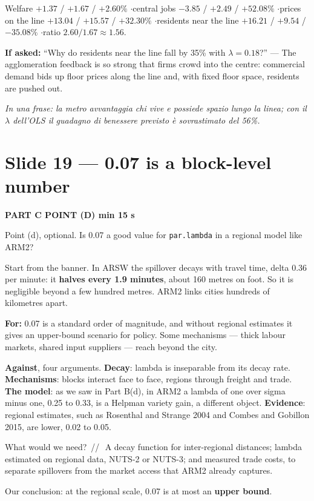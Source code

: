 \documentclass[11pt,a4paper]{article}
\newcommand{\slide}[3]{\Needspace{14\baselineskip}\section{#1}\textcolor{unicared}{\small\bfseries\MakeUppercase{#3}\quad\textperiodcentered\quad #2}\par}
\newcommand{\idea}[1]{\par{\small\itshape\color{unicablue}In una frase: #1}\par}
\newcommand{\pause}{\textcolor{unicared}{\,/\!/\,}}
\begin{document}
\begin{nums}
Welfare $+1.37$ / $+1.67$ / $+2.60\%$ \quad$\cdot$\quad central jobs $-3.85$ / $+2.49$ / $+52.08\%$ \quad$\cdot$\quad prices on the line $+13.04$ / $+15.57$ / $+32.30\%$ \quad$\cdot$\quad residents near the line $+16.21$ / $+9.54$ / $-35.08\%$ \quad$\cdot$\quad ratio $2.60/1.67 \approx 1.56$.
\end{nums}
\begin{ask}
\textbf{If asked:} ``Why do residents near the line fall by 35\% with $\lambda = 0.18$?'' --- The agglomeration feedback is so strong that firms crowd into the centre: commercial demand bids up floor prices along the line and, with fixed floor space, residents are pushed out.
\end{ask}
\idea{la metro avvantaggia chi vive e possiede spazio lungo la linea; con il $\lambda$ dell'OLS il guadagno di benessere previsto è sovrastimato del 56\%.}

\slide{Slide 19 --- 0.07 is a block-level number}{1 min 15 s}{Part C \textperiodcentered{} point (d)}

\begin{say}
Point (d), optional. Is 0.07 a good value for \texttt{par.lambda} in a regional model like ARM2?

Start from the banner. In ARSW the spillover decays with travel time, delta 0.36 per minute: it \textbf{halves every 1.9 minutes}, about 160 metres on foot. So it is negligible beyond a few hundred metres. ARM2 links cities hundreds of kilometres apart.

\textbf{For:} 0.07 is a standard order of magnitude, and without regional estimates it gives an upper-bound scenario for policy. Some mechanisms --- thick labour markets, shared input suppliers --- reach beyond the city.

\textbf{Against}, four arguments. \textbf{Decay}: lambda is inseparable from its decay rate. \textbf{Mechanisms}: blocks interact face to face, regions through freight and trade. \textbf{The model}: as we saw in Part B(d), in ARM2 a lambda of one over sigma minus one, 0.25 to 0.33, is a Helpman variety gain, a different object. \textbf{Evidence}: regional estimates, such as Rosenthal and Strange 2004 and Combes and Gobillon 2015, are lower, 0.02 to 0.05.

What would we need? \pause\ A decay function for inter-regional distances; lambda estimated on regional data, NUTS-2 or NUTS-3; and measured trade costs, to separate spillovers from the market access that ARM2 already captures.

Our conclusion: at the regional scale, 0.07 is at most an \textbf{upper bound}.
\end{say}
\end{document}
